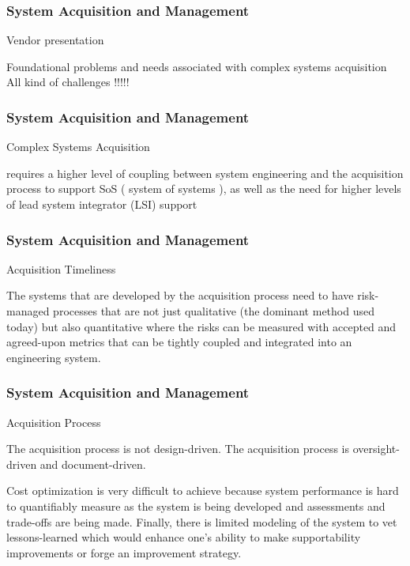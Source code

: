 \newpage
\begin{frame}
\frametitle{ System Acquisition and Management }
\begin{block}{Vendor presentation }

Foundational problems and needs
associated with  complex systems acquisition   {  All kind of challenges !!!!! }


\end{block}
\end{frame}



\newpage
\begin{frame}
\frametitle{ System Acquisition and Management }
\begin{block}{Complex Systems Acquisition }

requires a higher level of coupling between system
engineering and the acquisition process to support SoS ( system of systems ), as well as the need for higher
levels of lead system integrator (LSI) support

\end{block}
\end{frame}


\newpage
\begin{frame}
\frametitle{ System Acquisition and Management }
\begin{block}{Acquisition Timeliness  }

The systems that are
developed by the acquisition process need to have risk-managed processes that are not just
qualitative (the dominant method used today) but also quantitative where the risks can be
measured with accepted and agreed-upon metrics that can be tightly coupled and integrated
into an engineering system.

\end{block}
\end{frame}


\newpage
\begin{frame}
\frametitle{ System Acquisition and Management }
\begin{block}{Acquisition Process  }

The acquisition process is not design-driven. The  acquisition process is
oversight-driven and document-driven.

Cost optimization is very difficult to
achieve because system performance is hard to quantifiably measure as the system is
being developed and assessments and trade-offs are being made. Finally, there is limited
modeling of the system to vet lessons-learned which would enhance one’s ability to make
supportability improvements or forge an improvement strategy. 


\end{block}
\end{frame}


